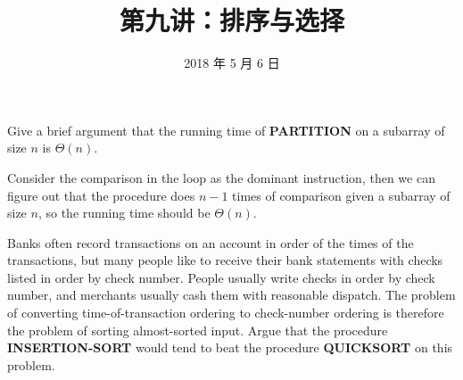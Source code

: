 \documentclass[12pt, a4paper, UTF8]{ctexart}
\title{第九讲：排序与选择}
\date{2018 年 5 月 6 日}     %
\begin{document}
\maketitle
\noplagiarism	%
\beginrequired	%

\begin{problem}[TC: 7.1-3]	%
  Give a brief argument that the running time of \textbf{PARTITION} on 
  a subarray of size $n$ is $\Theta(n)$.
\end{problem}


\begin{solution}
  Consider the comparison in the loop as the dominant instruction, 
  then we can figure out that the procedure does $n-1$ times of comparison 
  given a subarray of size $n$, so the running time should be $\Theta(n)$.
\end{solution}

\begin{problem}[TC: 7.2-4]
  Banks often record transactions on an account in order of the times 
  of the transactions, but many people like to receive their bank statements 
  with checks listed in order by check number. People usually write 
  checks in order by check number, and merchants usually cash them with 
  reasonable dispatch. The problem of converting time-of-transaction 
  ordering to check-number ordering is therefore the problem of sorting 
  almost-sorted input. Argue that the procedure \textbf{INSERTION-SORT} 
  would tend to beat the procedure \textbf{QUICKSORT} on this problem.
\end{problem}
\end{document}
